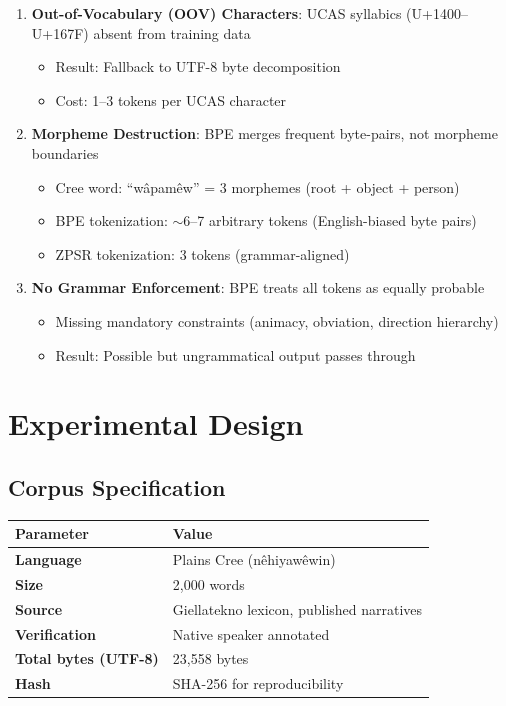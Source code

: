 \documentclass[11pt,oneside]{article}
\begin{document}
\begin{enumerate}
  \item \textbf{Out-of-Vocabulary (OOV) Characters}: UCAS syllabics (U+1400--U+167F) absent from training data
  \begin{itemize}
    \item Result: Fallback to UTF-8 byte decomposition
    \item Cost: 1--3 tokens per UCAS character
  \end{itemize}

  \item \textbf{Morpheme Destruction}: BPE merges frequent byte-pairs, not morpheme boundaries
  \begin{itemize}
    \item Cree word: ``wâpamêw'' = 3 morphemes (root + object + person)
    \item BPE tokenization: $\sim 6$--7 arbitrary tokens (English-biased byte pairs)
    \item ZPSR tokenization: 3 tokens (grammar-aligned)
  \end{itemize}

  \item \textbf{No Grammar Enforcement}: BPE treats all tokens as equally probable
  \begin{itemize}
    \item Missing mandatory constraints (animacy, obviation, direction hierarchy)
    \item Result: Possible but ungrammatical output passes through
  \end{itemize}
\end{enumerate}

\section{Experimental Design}

\subsection{Corpus Specification}

\begin{center}
\begin{tabular}{ll}
\toprule
Parameter & Value \\
\midrule
\textbf{Language} & Plains Cree (n\^{e}hiyaw\^{e}win) \\
\textbf{Size} & 2,000 words \\
\textbf{Source} & Giellatekno lexicon, published narratives \\
\textbf{Verification} & Native speaker annotated \\
\textbf{Total bytes (UTF-8)} & 23,558 bytes \\
\textbf{Hash} & SHA-256 for reproducibility \\
\bottomrule
\end{tabular}
\end{center}
\end{document}
